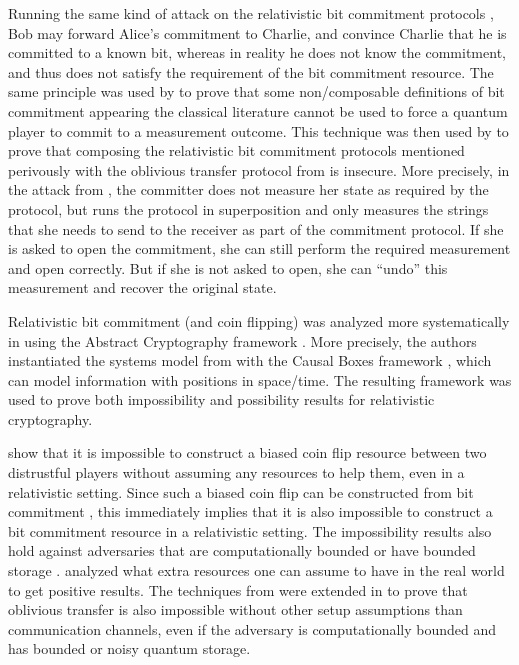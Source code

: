 Running the same kind of attack on the relativistic bit commitment
protocols \cite{Ken99,Ken12,KTHW13}, Bob may forward Alice's
commitment to Charlie, and convince Charlie that he is committed to a
known bit, whereas in reality he does not know the commitment, and
thus does not satisfy the requirement of the bit commitment
resource. The same principle was used by \textcite{BCMS98} to prove
that some non\-/composable definitions of bit commitment appearing the
classical literature cannot be used to force a quantum player to
commit to a measurement outcome. This technique was then used by
\textcite[Appendix A]{Kan15} to prove that composing the relativistic
bit commitment protocols mentioned perivously with the oblivious
transfer protocol from \textcite{Unr10} is insecure. More precisely,
in the attack from \textcite{BCMS98,Kan15}, the committer does not
measure her state as required by the protocol, but runs the protocol
in superposition and only measures the strings that she needs to send
to the receiver as part of the commitment protocol. If she is asked to
open the commitment, she can still perform the required measurement
and open correctly. But if she is not asked to open, she can ``undo''
this measurement and recover the original state.

Relativistic bit commitment (and coin flipping) was analyzed more
systematically in \textcite{VPdR19,Pro20} using the Abstract
Cryptography framework \cite{MR11}. More precisely, the authors
instantiated the systems model from \textcite{MR11} with the Causal
Boxes framework \cite{PMMRT17}, which can model information with
positions in space\-/time. The resulting framework was used to prove
both impossibility and possibility results for relativistic
cryptography.

\textcite{VPdR19} show that it is impossible to construct a biased
coin flip resource between two distrustful players without assuming
any resources to help them, even in a relativistic setting.  Since
such a biased coin flip can be constructed from bit commitment
\cite{Blu83,DM13}, this immediately implies that it is also impossible
to construct a bit commitment resource in a relativistic setting. The
impossibility results also hold against adversaries that are
computationally bounded or have bounded storage
\cite{VPdR19}. \textcite{Pro20} analyzed what extra resources one can
assume to have in the real world to get positive results. The
techniques from \textcite{VPdR19} were extended in \textcite{LdR21} to
prove that oblivious transfer is also impossible without other setup
assumptions than communication channels, even if the adversary is
computationally bounded and has bounded or noisy quantum storage.

